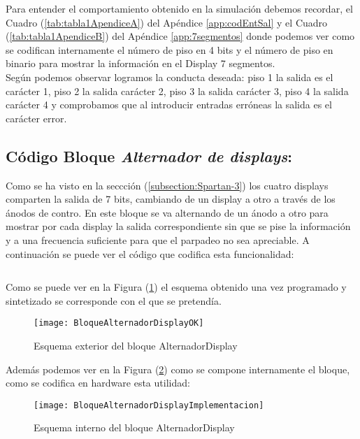 	Para entender el comportamiento obtenido en la simulación debemos recordar, el Cuadro (\ref{tab:tabla1ApendiceA}) del Apéndice \ref{app:codEntSal} y el Cuadro (\ref{tab:tabla1ApendiceB}) del Apéndice \ref{app:7segmentos} donde podemos ver como se codifican internamente el número de piso en 4 bits y el número de piso en binario para mostrar la información en el Display 7 segmentos. \\
	
	Según podemos observar logramos la conducta deseada: piso 1 la salida es el carácter 1, piso 2 la salida carácter 2, piso 3 la salida carácter 3, piso 4 la salida carácter 4 y comprobamos que al introducir entradas erróneas la salida es el carácter error.

\subsection{Código Bloque \textit{Alternador de displays}:} \label{code:AlternadorDisplay}
	Como se ha visto en la seccción (\ref{subsection:Spartan-3}) los cuatro displays comparten la salida de 7 bits, cambiando de un display a otro a través de los ánodos de contro. En este bloque se va alternando de un ánodo a otro para mostrar por cada display la salida correspondiente sin que se pise la información y a una frecuencia suficiente para que el parpadeo no sea apreciable. A continuación se puede ver el código que codifica esta funcionalidad: \\ 

	\inputminted[frame=lines,fontsize=\footnotesize,linenos]{vhdl}{CodeFiles/AlternadorDisplay.vhd}
	
		Como se puede ver en la Figura (\ref{fig:BloqueAlternadorDisplayOK}) el esquema obtenido una vez programado y sintetizado se corresponde con el que se pretendía.
    \begin{figure}[H]
		    \centering
		    \texttt{[image: BloqueAlternadorDisplayOK]}
		    \caption{Esquema exterior del bloque AlternadorDisplay}
		    \label{fig:BloqueAlternadorDisplayOK}
	\end{figure}
    Además podemos ver en la Figura (\ref{fig:BloqueAlternadorDisplayImplementacion}) como se compone internamente el bloque, como se codifica en hardware esta utilidad:
    \begin{figure}[H]
		    \centering
		    \texttt{[image: BloqueAlternadorDisplayImplementacion]}
		    \caption{Esquema interno del bloque AlternadorDisplay}
		    \label{fig:BloqueAlternadorDisplayImplementacion}
	\end{figure}

